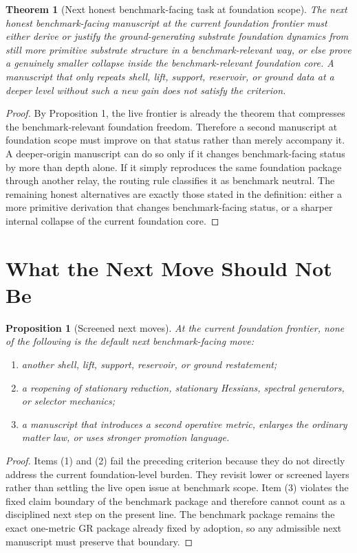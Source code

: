 \documentclass[11pt]{article}
\newtheorem{proposition}{Proposition}
\newtheorem{theorem}{Theorem}
\begin{document}
\begin{theorem}[Next honest benchmark-facing task at foundation scope]
The next honest benchmark-facing manuscript at the current foundation frontier must either derive or justify the ground-generating substrate foundation dynamics from still more primitive substrate structure in a benchmark-relevant way, or else prove a genuinely smaller collapse inside the benchmark-relevant foundation core. A manuscript that only repeats shell, lift, support, reservoir, or ground data at a deeper level without such a new gain does not satisfy the criterion.
\end{theorem}

\begin{proof}
By Proposition 1, the live frontier is already the theorem that compresses the benchmark-relevant foundation freedom. Therefore a second manuscript at foundation scope must improve on that status rather than merely accompany it. A deeper-origin manuscript can do so only if it changes benchmark-facing status by more than depth alone. If it simply reproduces the same foundation package through another relay, the routing rule classifies it as benchmark neutral. The remaining honest alternatives are exactly those stated in the definition: either a more primitive derivation that changes benchmark-facing status, or a sharper internal collapse of the current foundation core.
\end{proof}

\section{What the Next Move Should Not Be}

\begin{proposition}[Screened next moves]
At the current foundation frontier, none of the following is the default next benchmark-facing move:
\begin{enumerate}
    \item another shell, lift, support, reservoir, or ground restatement;
    \item a reopening of stationary reduction, stationary Hessians, spectral generators, or selector mechanics;
    \item a manuscript that introduces a second operative metric, enlarges the ordinary matter law, or uses stronger promotion language.
\end{enumerate}
\end{proposition}

\begin{proof}
Items (1) and (2) fail the preceding criterion because they do not directly address the current foundation-level burden. They revisit lower or screened layers rather than settling the live open issue at benchmark scope. Item (3) violates the fixed claim boundary of the benchmark package and therefore cannot count as a disciplined next step on the present line. The benchmark package remains the exact one-metric GR package already fixed by adoption, so any admissible next manuscript must preserve that boundary.
\end{proof}
\end{document}
